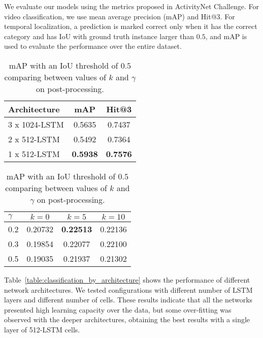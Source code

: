 \documentclass{article}
\begin{document}
We evaluate our models using the metrics proposed in ActivityNet Challenge. For video classification, we use mean average precision (mAP) and Hit@3. For temporal localization, a prediction is marked correct only when it has the correct category and has IoU with ground truth instance larger than $0.5$, and mAP is used to evaluate the performance over the entire dataset.

\begin{table}[h]
    \parbox{.45\linewidth}{
        \centering
        \begin{tabular}{l|cc}
        \textbf{Architecture} & \textbf{mAP} & \textbf{Hit@3} \\
        \hline
        3 x 1024-LSTM & 0.5635 & 0.7437 \\
        2 x 512-LSTM & 0.5492 & 0.7364 \\
        1 x 512-LSTM & \bf0.5938 & \bf0.7576 \\
        \end{tabular}
        \vspace{.5cm}
        \caption{Results for classification task comparing different architectures.}
        \label{table:classification_by_architecture}
    }
    \hfill
    \parbox{.45\linewidth}{
        \centering
        \begin{tabular}{l|ccc}
        \textbf{$\gamma$} & \textbf{$k=0$} & \textbf{$k=5$} & \textbf{$k=10$} \\
        \hline
        0.2 & 0.20732 & \bf0.22513 & 0.22136 \\
        0.3 & 0.19854 & 0.22077 & 0.22100 \\
        0.5 & 0.19035 & 0.21937 & 0.21302 \\
        \end{tabular}
        \vspace{.2cm}
        \caption{mAP with an IoU threshold of $0.5$ comparing between values of $k$ and $\gamma$ on post-processing.}
        \label{table:detection_postprocessing_comparison}
    }
\end{table}

Table~\ref{table:classification_by_architecture} shows the performance of different network architectures. We tested configurations with different number of LSTM layers and different number of cells. These results indicate that all the networks presented high learning capacity over the data, but some over-fitting was observed with the deeper architectures, obtaining the best results with a single layer of 512-LSTM cells.
\end{document}
